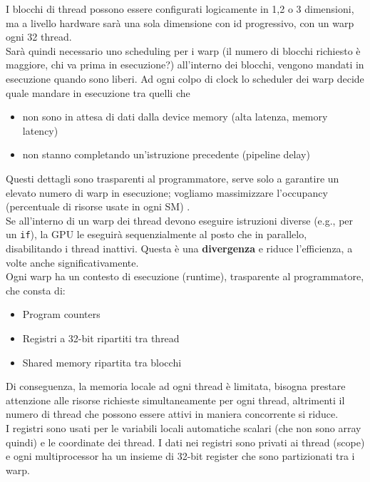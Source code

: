 I blocchi di thread possono essere configurati logicamente in 1,2 o 3 dimensioni, ma a livello hardware sarà una sola dimensione con id progressivo, con un warp ogni 32 thread.\\

Sarà quindi necessario uno scheduling per i warp (il numero di blocchi richiesto è maggiore, chi va prima in esecuzione?) all'interno dei blocchi, vengono mandati in esecuzione quando sono liberi. Ad ogni colpo di clock lo scheduler dei warp decide quale mandare in esecuzione tra quelli che 
\begin{itemize}
	\item non sono in attesa di dati dalla device memory (alta latenza, memory latency)
	\item non stanno completando un'istruzione precedente (pipeline delay)
\end{itemize}
Questi dettagli sono trasparenti al programmatore, serve solo a garantire un elevato numero di warp in esecuzione; vogliamo massimizzare l'occupancy (percentuale di risorse usate in ogni SM) .\\

Se all'interno di un warp dei thread devono eseguire istruzioni diverse (e.g., per un \texttt{if}), la GPU le eseguirà sequenzialmente al posto che in parallelo, disabilitando i thread inattivi. Questa è una \textbf{divergenza} e riduce l'efficienza, a volte anche significativamente.  \\

Ogni warp ha un contesto di esecuzione (runtime), trasparente al programmatore, che consta di: 
\begin{itemize}
	\item Program counters
	\item Registri a 32-bit ripartiti tra thread
	\item Shared memory ripartita tra blocchi
\end{itemize} 

Di conseguenza, la memoria locale ad ogni thread è limitata, bisogna prestare attenzione alle risorse richieste simultaneamente per ogni thread, altrimenti il numero di thread che possono essere attivi in maniera concorrente si riduce.\\

I registri sono usati per le variabili locali automatiche scalari (che non sono array quindi) e le coordinate dei thread. I dati nei registri sono privati ai thread (scope) e ogni multiprocessor ha un insieme di 32-bit register che sono partizionati tra i warp.\\

